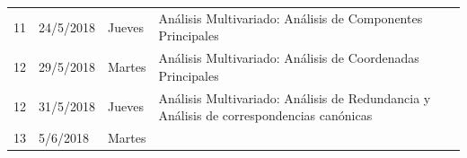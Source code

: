 \documentclass[]{book}
\theoremstyle{definition}
\theoremstyle{definition}
\theoremstyle{definition}
\theoremstyle{remark}
\begin{document}
\begin{longtable}[]{@{}llll@{}}
\begin{minipage}[t]{0.05\columnwidth}\raggedright
11\strut
\end{minipage} & \begin{minipage}[t]{0.07\columnwidth}\raggedright
24/5/2018\strut
\end{minipage} & \begin{minipage}[t]{0.05\columnwidth}\raggedright
Jueves\strut
\end{minipage} & \begin{minipage}[t]{0.71\columnwidth}\raggedright
Análisis Multivariado: Análisis de Componentes Principales\strut
\end{minipage}\tabularnewline
\begin{minipage}[t]{0.05\columnwidth}\raggedright
12\strut
\end{minipage} & \begin{minipage}[t]{0.07\columnwidth}\raggedright
29/5/2018\strut
\end{minipage} & \begin{minipage}[t]{0.05\columnwidth}\raggedright
Martes\strut
\end{minipage} & \begin{minipage}[t]{0.71\columnwidth}\raggedright
Análisis Multivariado: Análisis de Coordenadas Principales\strut
\end{minipage}\tabularnewline
\begin{minipage}[t]{0.05\columnwidth}\raggedright
12\strut
\end{minipage} & \begin{minipage}[t]{0.07\columnwidth}\raggedright
31/5/2018\strut
\end{minipage} & \begin{minipage}[t]{0.05\columnwidth}\raggedright
Jueves\strut
\end{minipage} & \begin{minipage}[t]{0.71\columnwidth}\raggedright
Análisis Multivariado: Análisis de Redundancia y Análisis de
correspondencias canónicas\strut
\end{minipage}\tabularnewline
\begin{minipage}[t]{0.05\columnwidth}\raggedright
13\strut
\end{minipage} & \begin{minipage}[t]{0.07\columnwidth}\raggedright
5/6/2018\strut
\end{minipage} & \begin{minipage}[t]{0.05\columnwidth}\raggedright
Martes\strut
\end{minipage} & \begin{minipage}[t]{0.71\columnwidth}\raggedright

\end{minipage}
\end{longtable}
\end{document}
